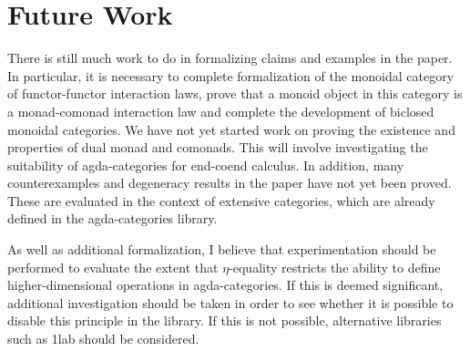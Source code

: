 \documentclass{amsart}
\theoremstyle{remark}
\begin{document}
\section{Future Work}
There is still much work to do in formalizing claims and examples in the paper. In particular, it is necessary to complete formalization of the monoidal category of functor-functor interaction laws, prove that a monoid object in this category is a monad-comonad interaction law and complete the development of biclosed monoidal categories. We have not yet started work on proving the existence and properties of dual monad and comonads. This will involve investigating the suitability of agda-categories for end-coend calculus. In addition, many counterexamples and degeneracy results in the paper have not yet been proved. These are evaluated in the context of extensive categories, which are already defined in the agda-categories library.

As well as additional formalization, I believe that experimentation should be performed to evaluate the extent that $\eta$-equality restricts the ability to define higher-dimensional operations in agda-categories. If this is deemed significant, additional investigation should be taken in order to see whether it is possible to disable this principle in the library. If this is not possible, alternative libraries such as 1lab should be considered.
 

\printbibliography
\end{document}
